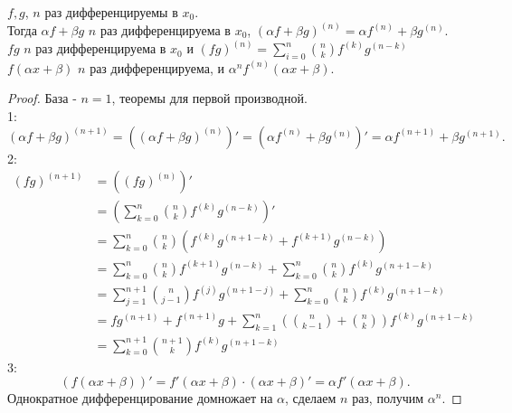 \documentclass[11pt, oneside]{article}   	%
\begin{document}
    \begin{theorem}
        $f,g$,  $n$ раз дифференцируемы в $x_0$.\\
        Тогда $\alpha f + \beta g$ $n$ раз дифференцируема в $x_0$, $(\alpha f + \beta g)^{(n)} = \alpha f^{(n)} + \beta g^{(n)}$.\\
        $fg$  $n$ раз дифференцируема в $x_0$ и $(fg)^{(n)} = \sum\limits_{i=0}^{n} \binom{n}{k}f^{(k)}g^{(n-k)}$ \\
        $f(\alpha x + \beta)$  $n$ раз дифференцируема, и $\alpha^{n} f^{(n)}(\alpha x + \beta)$.\\
        \begin{proof}
            База - $n=1$, теоремы для первой производной.\\
            1:
            \[ (\alpha f + \beta g)^{(n+1)} = ((\alpha f + \beta g)^{(n)})' = (\alpha f^{(n)} + \beta g^{(n)})' = \alpha f^{(n+1)} + \beta g^{(n+1)}.\]
            2:
            \begin{equation*}
                \begin{split}
                    (fg)^{(n+1)} &= ((fg)^{(n)})'\\
                                 &= \left( \sum\limits_{k=0}^{n}\binom{n}{k}f^{(k)}g^{(n-k)} \right) '\\
                                 &= \sum\limits_{k=0}^{n}\binom{n}{k}\left(f^{(k)}g^{(n+1-k)}+f^{(k+1)}g^{(n-k)}\right)\\
                                 &= \sum\limits_{k=0}^{n}\binom{n}{k}f^{(k+1)}g^{(n-k)} + \sum\limits_{k=0}^{n}\binom{n}{k}f^{(k)}g^{(n+1-k)}\\
                                 &= \sum\limits_{j=1}^{n+1}\binom{n}{j-1}f^{(j)}g^{(n+1-j)} + \sum\limits_{k=0}^{n}\binom{n}{k}f^{(k)}g^{(n+1-k)}\\
                                 &= fg^{(n+1)} + f^{(n+1)}g + \sum\limits_{k=1}^{n}(\binom{n}{k-1}+\binom{n}{k})f^{(k)}g^{(n+1-k)}\\
                                 &= \sum\limits_{k=0}^{n+1}\binom{n+1}{k}f^{(k)}g^{(n+1-k)}
                \end{split}
            \end{equation*}
            3:
            \[ (f(\alpha x + \beta))' = f'(\alpha x + \beta) \cdot (\alpha x + \beta)' = \alpha f'(\alpha x + \beta) .\]
            Однократное дифференцирование домножает на $\alpha$, сделаем $n$ раз, получим $\alpha^{n}$.
        \end{proof}
    \end{theorem}
\end{document}
